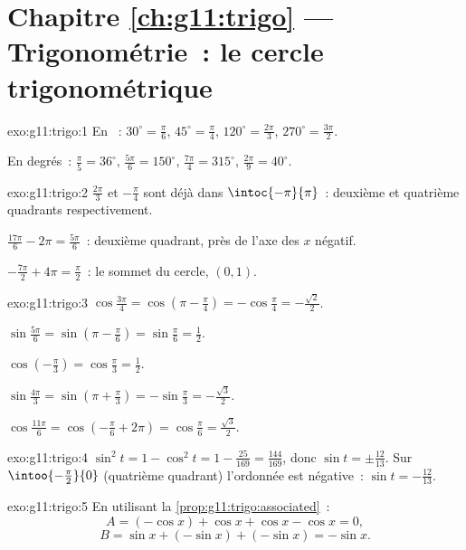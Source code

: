 \section*{Chapitre \ref{ch:g11:trigo} --- Trigonométrie~: le cercle trigonométrique}

\begin{solution}{exo:g11:trigo:1}
En ~: $30^\circ = \frac{\pi}{6}$, $45^\circ = \frac{\pi}{4}$,
$120^\circ = \frac{2\pi}{3}$, $270^\circ = \frac{3\pi}{2}$.

En degrés~: $\frac{\pi}{5} = 36^\circ$, $\frac{5\pi}{6} = 150^\circ$,
$\frac{7\pi}{4} = 315^\circ$, $\frac{2\pi}{9} = 40^\circ$.
\end{solution}

\begin{solution}{exo:g11:trigo:2}
$\frac{2\pi}{3}$ et $-\frac{\pi}{4}$ sont déjà dans
$\intoc{-\pi}{\pi}$~: deuxième et quatrième quadrants respectivement.

$\frac{17\pi}{6} - 2\pi = \frac{5\pi}{6}$~: deuxième quadrant, près de
l'axe des $x$ négatif.

$-\frac{7\pi}{2} + 4\pi = \frac{\pi}{2}$~: le sommet du cercle,
$(0, 1)$.
\end{solution}

\begin{solution}{exo:g11:trigo:3}
$\cos\frac{3\pi}{4} = \cos\left(\pi - \frac\pi4\right)
= -\cos\frac\pi4 = -\frac{\sqrt2}{2}$.

$\sin\frac{5\pi}{6} = \sin\left(\pi - \frac\pi6\right)
= \sin\frac\pi6 = \frac12$.

$\cos\left(-\frac\pi3\right) = \cos\frac\pi3 = \frac12$.

$\sin\frac{4\pi}{3} = \sin\left(\pi + \frac\pi3\right)
= -\sin\frac\pi3 = -\frac{\sqrt3}{2}$.

$\cos\frac{11\pi}{6} = \cos\left(-\frac\pi6 + 2\pi\right)
= \cos\frac\pi6 = \frac{\sqrt3}{2}$.
\end{solution}

\begin{solution}{exo:g11:trigo:4}
$\sin^2 t = 1 - \cos^2 t = 1 - \frac{25}{169} = \frac{144}{169}$, donc
$\sin t = \pm\frac{12}{13}$. Sur $\intoo{-\frac\pi2}{0}$ (quatrième
quadrant) l'ordonnée est négative~: $\sin t = -\frac{12}{13}$.
\end{solution}

\begin{solution}{exo:g11:trigo:5}
En utilisant la \cref{prop:g11:trigo:associated}~:
\[
A = (-\cos x) + \cos x + \cos x - \cos x = 0 ,
\]
\[
B = \sin x + (-\sin x) + (-\sin x) = -\sin x .
\]
\end{solution}

